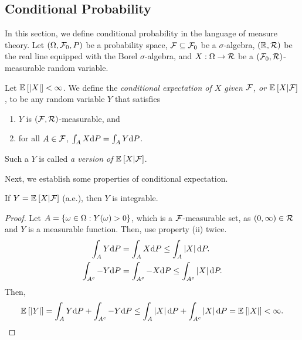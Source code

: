 \subsection{Conditional Probability}

In this section, we define conditional probability in the language of measure theory. Let $\left(\Omega, \mathcal{F}_0, P\right)$ be a probability space, $\mathcal{F} \subseteq \mathcal{F}_0$ be a $\sigma$-algebra, $\left(\mathbb{R}, \mathcal{R}\right)$ be the real line equipped with the Borel $\sigma$-algebra, and $X: \Omega \rightarrow \mathcal{R}$ be a $\left(\mathcal{F}_0, \mathcal{R}\right)$-measurable random variable.


\begin{defi}
    Let ${\mathbb E}_{}\left[\left|X\right|\right] < \infty$. We define the {\it conditional expectation of $X$ given $\mathcal{F}$, or ${\mathbb E}_{}\left[X | \mathcal{F}\right]$}, to be any random variable $Y$ that satisfies
    \begin{enumerate}[label=(\roman*)]
        \item $Y$ is $\left(\mathcal{F}, \mathcal{R}\right)$-measurable, and
        \item for all $A \in \mathcal{F}$, $\int_A X \text{d} P = \int_A Y \text{d} P$.
    \end{enumerate} 
    Such a $Y$ is called {\it a version of} ${\mathbb E}_{}\left[X | \mathcal{F}\right]$.
\end{defi}


Next, we establish some properties of conditional expectation.

\begin{lem}[Integrability]
    If $Y = {\mathbb E}_{}\left[X | \mathcal{F}\right]$ (a.e.), then $Y$ is integrable.
\end{lem}
\begin{proof}
    Let $A = \left\{\omega \in \Omega: Y(\omega) > 0\right\}$, which is a $\mathcal{F}$-measurable set, as $(0, \infty) \in \mathcal{R}$ and $Y$ is a measurable function. Then, use property (ii) twice.
    \begin{align*}
        \int_A Y \text{d} P &= \int_A X \text{d} P \leq \int_A \left|X\right| \text{d} P.\\
        \int_{A^c} -Y \text{d} P &= \int_{A^c} -X \text{d} P \leq \int_{A^c} \left|X\right| \text{d} P.
    \end{align*} 
    Then,
    \begin{align*}
        {\mathbb E}_{}\left[\left|Y\right|\right] = \int_A Y \text{d} P + \int_{A^c} -Y \text{d} P \leq \int_A \left|X\right| \text{d} P + \int_{A^c} \left|X\right| \text{d} P = {\mathbb E}_{}\left[\left|X\right|\right] < \infty.
    \end{align*}
\end{proof}


